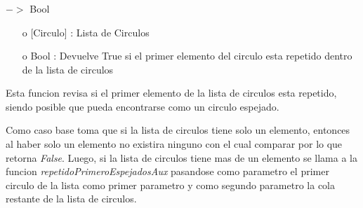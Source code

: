 \documentclass[10pt,journal]{IEEEtran}
\begin{document}
\subsubsection{\color{Red}{estaRepetidoPrimeroEspejados}}
\begin{description}[style=nextline]
        \item[\color{Green}{Signatura}] [Circulo] $->$ Bool
        \begin{itemize} 
        \item [o]  [Circulo] : Lista de Circulos
        \item [o]  Bool : Devuelve True si el primer elemento del circulo esta repetido dentro de la lista de circulos
        \end{itemize}        
        
        \item[\color{Green}{Descripción}]   Esta funcion revisa si el primer elemento de la lista de circulos esta repetido, siendo posible que pueda encontrarse como un circulo espejado. 
        
        Como caso base toma que si la lista de circulos tiene solo un elemento, entonces al haber solo un elemento no existira ninguno con el cual comparar por lo que retorna \textit{False}. Luego, si la lista de circulos tiene mas de un elemento se llama a la funcion \textit{repetidoPrimeroEspejadosAux} pasandose como parametro el primer circulo de la lista como primer parametro y como segundo parametro la cola restante de la lista de circulos.
\end{description}
\end{document}
